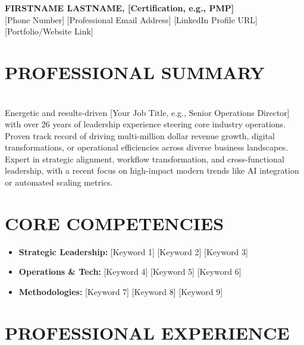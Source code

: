 \documentclass[10pt,a4paper]{article}
\newcommand{\resumeline}{\vspace{-8pt}\noindent\makebox[\linewidth]{\rule{\linewidth}{0.5pt}}\vspace{4pt}}
\begin{document}
	
	\begin{center}
		{\LARGE \bfseries \color{primary} FIRSTNAME LASTNAME, [Certification, e.g., PMP]} \\ \vspace{4pt}
		[Phone Number] \textbar{} [Professional Email Address] \textbar{} [LinkedIn Profile URL] \textbar{} [Portfolio/Website Link]
	\end{center}
	
	\section*{PROFESSIONAL SUMMARY}
	\resumeline
	\noindent \\
	Energetic and results-driven [Your Job Title, e.g., Senior Operations Director] with over 26 years of leadership experience steering core industry operations. Proven track record of driving multi-million dollar revenue growth, digital transformations, or operational efficiencies across diverse business landscapes. Expert in strategic alignment, workflow transformation, and cross-functional leadership, with a recent focus on high-impact modern trends like AI integration or automated scaling metrics.
	
	\section*{CORE COMPETENCIES}
	\resumeline
	\begin{itemize}
		\item \textbf{Strategic Leadership:} [Keyword 1] \textbar{} [Keyword 2] \textbar{} [Keyword 3]
		\item \textbf{Operations \& Tech:} [Keyword 4] \textbar{} [Keyword 5] \textbar{} [Keyword 6]
		\item \textbf{Methodologies:} [Keyword 7] \textbar{} [Keyword 8] \textbar{} [Keyword 9]
	\end{itemize}
	
	\section*{PROFESSIONAL EXPERIENCE}
	\resumeline
	
\end{document}
